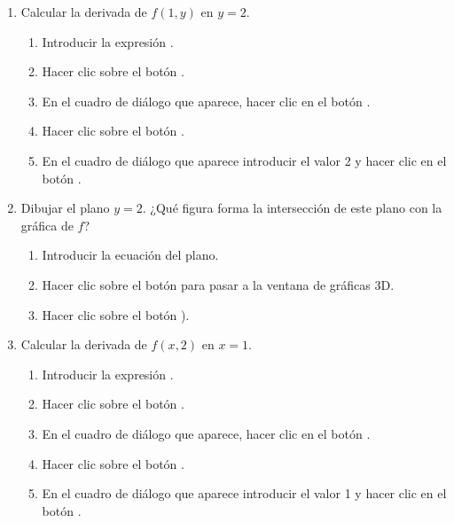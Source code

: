 \begin{enumerate}[leftmargin=*]
\begin{enumerate}
\item Calcular la derivada de $f(1,y)$ en $y=2$.
\begin{indicacion}
{
\begin{enumerate}
\item Introducir la expresión .
\item Hacer clic sobre el botón .
\item En el cuadro de diálogo que aparece, hacer clic en el botón .
\item Hacer clic sobre el botón .
\item En el cuadro de diálogo que aparece introducir el valor 2 y hacer clic en el botón .
\end{enumerate}
}
\end{indicacion}

\item Dibujar el plano $y=2$. ¿Qué figura forma la intersección de este plano con la gráfica de $f$?
\begin{indicacion}
{
\begin{enumerate}
\item Introducir la ecuación del plano.
\item Hacer clic sobre el botón  para pasar a la ventana de gráficas 3D.
\item Hacer clic sobre el botón ).
\end{enumerate}
}
\end{indicacion}

\item Calcular la derivada de $f(x,2)$ en $x=1$.
\begin{indicacion}
{
\begin{enumerate}
\item Introducir la expresión .
\item Hacer clic sobre el botón .
\item En el cuadro de diálogo que aparece, hacer clic en el botón .
\item Hacer clic sobre el botón .
\item En el cuadro de diálogo que aparece introducir el valor 1 y hacer clic en el botón .
\end{enumerate}
}
\end{indicacion}


\end{enumerate}
\end{enumerate}
